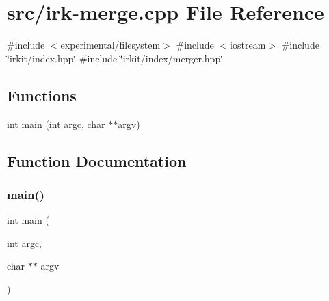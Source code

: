 \hypertarget{irk-merge_8cpp}{}\section{src/irk-\/merge.cpp File Reference}
\label{irk-merge_8cpp}
{\ttfamily \#include $<$experimental/filesystem$>$}\newline
{\ttfamily \#include $<$iostream$>$}\newline
{\ttfamily \#include \char`\"{}irkit/index.\+hpp\char`\"{}}\newline
{\ttfamily \#include \char`\"{}irkit/index/merger.\+hpp\char`\"{}}\newline
\subsection*{Functions}
\begin{DoxyCompactItemize}
\item 
int \mbox{\hyperlink{irk-merge_8cpp_a3c04138a5bfe5d72780bb7e82a18e627}{main}} (int argc, char $\ast$$\ast$argv)
\end{DoxyCompactItemize}


\subsection{Function Documentation}
\mbox{\label{irk-merge_8cpp_a3c04138a5bfe5d72780bb7e82a18e627}} 
\subsubsection{\texorpdfstring{main()}{main()}}
{\footnotesize\ttfamily int main (\begin{DoxyParamCaption}\item[{int}]{argc,  }\item[{char $\ast$$\ast$}]{argv }\end{DoxyParamCaption})}

